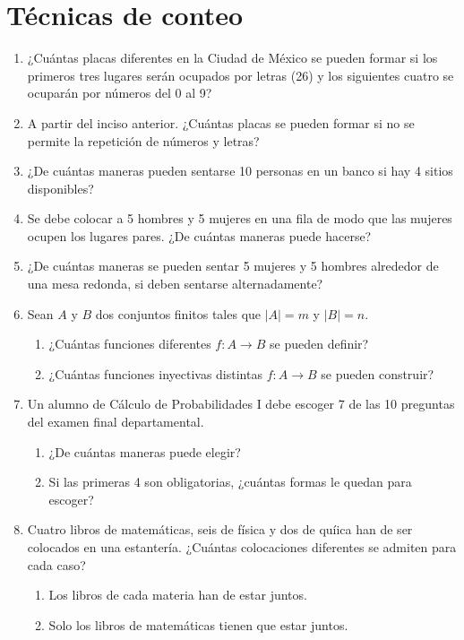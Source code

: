 \section{Técnicas de conteo}

\begin{enumerate}

	
\item ¿Cuántas placas diferentes en la Ciudad de México se pueden formar si los primeros tres lugares serán ocupados por letras (26) y los siguientes cuatro se ocuparán por números del 0 al 9?

\item A partir del inciso anterior. ¿Cuántas placas se pueden formar si no se permite la repetición de números y letras?

\item ¿De cuántas maneras pueden sentarse 10 personas en un banco si hay 4 sitios disponibles?

\item Se debe colocar a 5 hombres y 5 mujeres en una fila de modo que las mujeres ocupen los lugares pares. ¿De cuántas maneras puede hacerse?

\item ¿De cuántas maneras se pueden sentar 5 mujeres y 5 hombres alrededor de una mesa redonda, si deben sentarse alternadamente?

\item Sean $A$ y $B$ dos conjuntos finitos tales que $|A|=m$ y $|B|=n$.
\begin{enumerate}
	\item ¿Cuántas funciones diferentes $f:A \rightarrow B$ se pueden definir?
	\item ¿Cuántas funciones inyectivas distintas $f:A \rightarrow B$ se pueden construir?
\end{enumerate}

\item Un alumno de Cálculo de Probabilidades I debe escoger 7 de las 10 preguntas del examen final departamental.
\begin{enumerate}
	\item ¿De cuántas maneras puede elegir?
	\item Si las primeras 4 son obligatorias, ¿cuántas formas le quedan para escoger?
\end{enumerate}

\item Cuatro libros de matemáticas, seis de física y dos de quíica han de ser colocados en una estantería. ¿Cuántas colocaciones diferentes se admiten para cada caso?
\begin{enumerate}
	\item Los libros de cada materia han de estar juntos.
	\item Solo los libros de matemáticas tienen que estar juntos.
\end{enumerate}


\end{enumerate}
